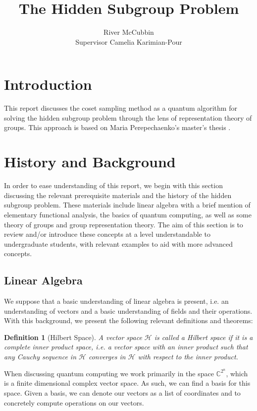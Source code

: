 \documentclass{article}
\title{The Hidden Subgroup Problem}
\author{River McCubbin\\[1cm]{\small Supervisor Camelia Karimian-Pour}}
\theoremstyle{plain}
\theoremstyle{centered}
\newtheorem{definition}{Definition}
\newcommand{\bb}[1]{\mathbb{#1}}
\renewcommand{\cal}[1]{\mathcal{#1}}
\begin{document}
\maketitle


\section{Introduction}\label{sec:introduction}
        This report discusses the coset sampling method as a quantum algorithm for solving the hidden subgroup problem through the lens of representation theory of groups. This approach is based on Maria Perepechaenko's master's thesis \cite{perepechaenko}.

\section{History and Background}\label{sec:history}

    In order to ease understanding of this report, we begin with this section discussing the relevant prerequisite materials and the history of the hidden subgroup problem. 
    These materials include linear algebra with a brief mention of elementary functional analysis, the basics of quantum computing, as well as some theory of groups and group representation theory.
    The aim of this section is to review and/or introduce these concepts at a level understandable to undergraduate students, with relevant examples to aid with more advanced concepts.

    \subsection{Linear Algebra}\label{history:linear_algebra}
        We suppose that a basic understanding of linear algebra is present, i.e. an understanding of vectors and a basic understanding of fields and their operations.
        With this background, we present the following relevant definitions and theorems:
        \begin{definition}[Hilbert Space]\label{def:hilbert_space}
            A vector space $\cal{H}$ is called a \textit{Hilbert space} if it is a complete inner product space, i.e. a vector space with an inner product such that any Cauchy sequence in $\cal{H}$ converges in $\cal{H}$ with respect to the inner product.
        \end{definition}
        When discussing quantum computing we work primarily in the space $\bb{C}^{2^n}$, which is a finite dimensional complex vector space.
        As such, we can find a basis for this space.
        Given a basis, we can denote our vectors as a list of coordinates and to concretely compute operations on our vectors.
        
\end{document}
